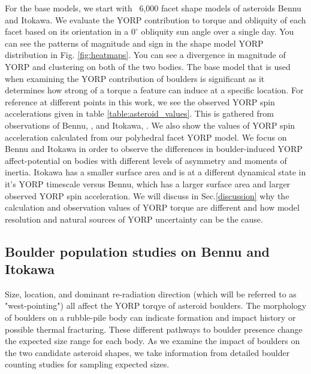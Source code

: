 For the base models, we start with ~6,000 facet shape models of asteroids Bennu and Itokawa. We evaluate the YORP contribution to torque and obliquity of each facet based on its orientation in a $0^{\circ}$ obliquity sun angle over a single day. You can see the patterns of magnitude and sign in the shape model YORP distribution in Fig. \ref{fig:heatmaps}. You can see a divergence in magnitude of YORP and clustering on both of the two bodies. The base model that is used when examining the YORP contribution of boulders is significant as it determines how strong of a torque a feature can induce at a specific location. For reference at different points in this work, we see the observed YORP spin accelerations given in table \ref{table:asteroid_values}. This is gathered from observations of Bennu, \cite{Daly2020} \cite{Scheeres2016} \cite{Hergenrother2019}, and Itokawa, \cite{Fujiwara2006} \cite{Lowry2007} \cite{Breiter2009}. We also show the values of YORP spin acceleration calculated from our polyhedral facet YORP model. We focus on Bennu and Itokawa in order to observe the differences in boulder-induced YORP affect-potential on bodies with different levels of asymmetry and moments of inertia. Itokawa has a smaller surface area and is at a different dynamical state in it's YORP timescale versus Bennu, which has a larger surface area and larger observed YORP spin acceleration. We will discuss in Sec.\ref{discussion} why the calculation and observation values of YORP torque are different and how model resolution and natural sources of YORP uncertainty can be the cause.


\subsection{Boulder population studies on Bennu and Itokawa} \label{BP}

Size, location, and dominant re-radiation direction (which will be referred to as "west-pointing") all affect the YORP torqye of asteroid boulders. The morphology of boulders on a rubble-pile body can indicate formation and impact history or possible thermal fracturing. These different pathways to boulder presence change the expected size range for each body. As we examine the impact of boulders on the two candidate asteroid shapes, we take information from detailed boulder counting studies for sampling expected sizes. 


